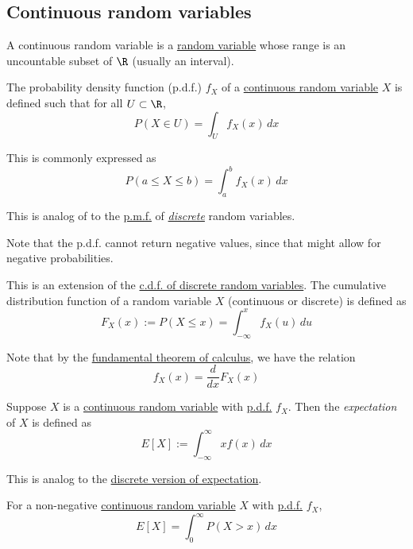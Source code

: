 \subsection{Continuous random variables}\label{a629967}

\label{bdb1e15}

A continuous random variable is a \href{b96960b}{random variable} whose range
is an uncountable subset of $\R$ (usually an interval).

\label{cb9d3f0}

The probability density function (p.d.f.) $f_X$ of a \href{bdb1e15}{continuous
random variable} $X$ is defined such that for all $U\subset\R$,
$$
  P(X\in U)=\int_Uf_X(x)\,dx
$$

This is commonly expressed as
$$
  P(a\leq X\leq b)=\int_a^bf_X(x)\,dx
$$

This is analog of to the \href{bcef5f1}{p.m.f.} of
\href{f831030}{\textit{discrete}} random variables.

Note that the p.d.f. cannot return negative values, since that might allow for
negative probabilities.

\label{ad1290d}

This is an extension of the \href{f05a29d}{c.d.f. of discrete random
variables}. The cumulative distribution function of a random variable $X$
(continuous or discrete) is defined as
$$
  F_X(x):=P(X\leq x)=\int_{-\infty}^xf_X(u)\,du
$$

Note that by the \href{b869dc0}{fundamental theorem of calculus}, we have the
relation
$$
  f_X(x)=\frac{d}{dx}F_X(x)
$$

\label{d13ac42}

Suppose $X$ is a \href{bdb1e15}{continuous random variable} with
\href{cb9d3f0}{p.d.f.} $f_X$. Then the \textit{expectation} of $X$ is defined
as
$$
  E[X]:=\int_{-\infty}^{\infty}xf(x)\,dx
$$

This is analog to the \href{ecb2162}{discrete version of expectation}.

\label{a997b34}

For a non-negative \href{bdb1e15}{continuous random variable} $X$ with
\href{cb9d3f0}{p.d.f.} $f_X$,
$$
  E[X]=\int_0^\infty P(X>x)\,dx
$$


